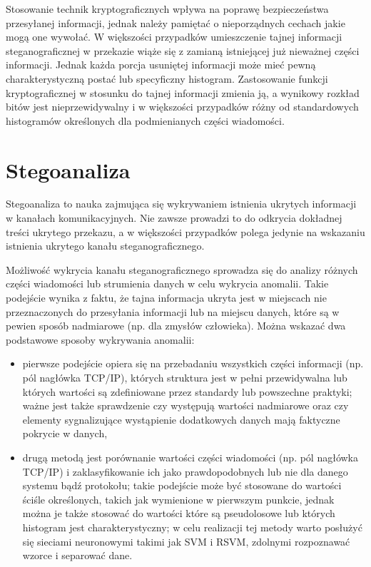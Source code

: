 \documentclass[a4paper,12pt,twoside,openany]{report}
\begin{document}
Stosowanie technik kryptograficznych wpływa na poprawę bezpieczeństwa 
przesyłanej informacji, jednak należy pamiętać o nieporządnych cechach jakie 
mogą one wywołać. W większości przypadków umieszczenie tajnej informacji 
steganograficznej w przekazie wiąże się z zamianą istniejącej już nieważnej 
części informacji. Jednak każda porcja usuniętej informacji może mieć pewną 
charakterystyczną postać lub specyficzny histogram. Zastosowanie funkcji 
kryptograficznej w stosunku do tajnej informacji zmienia ją, a wynikowy rozkład 
bitów jest nieprzewidywalny i w większości przypadków różny od standardowych 
histogramów określonych dla podmienianych części wiadomości.
\section{Stegoanaliza}
Stegoanaliza to nauka zajmująca się wykrywaniem istnienia ukrytych informacji w 
kanałach komunikacyjnych. Nie zawsze prowadzi to do odkrycia dokładnej treści 
ukrytego przekazu, a w większości przypadków polega jedynie na wskazaniu 
istnienia ukrytego kanału steganograficznego.

Możliwość wykrycia kanału steganograficznego sprowadza się do analizy różnych 
części wiadomości lub strumienia danych w celu wykrycia anomalii. Takie 
podejście wynika z faktu, że tajna informacja ukryta jest w miejscach nie 
przeznaczonych do przesyłania informacji lub na miejscu danych, które są w 
pewien sposób nadmiarowe (np. dla zmysłów człowieka). Można wskazać dwa 
podstawowe sposoby wykrywania anomalii:
\begin{itemize}
	\item pierwsze podejście opiera się na przebadaniu wszystkich części 
informacji (np. pól nagłówka TCP/IP), których struktura jest w pełni 
przewidywalna lub których wartości są zdefiniowane przez standardy lub 
powszechne praktyki; ważne jest także sprawdzenie czy występują wartości 
nadmiarowe oraz czy elementy sygnalizujące wystąpienie dodatkowych danych mają 
faktyczne pokrycie w danych,
	\item drugą metodą jest porównanie wartości części wiadomości (np. pól 
nagłówka TCP/IP) i zaklasyfikowanie ich jako prawdopodobnych lub nie dla danego 
systemu bądź protokołu; takie podejście może być stosowane do wartości ściśle 
określonych, takich jak wymienione w pierwszym punkcie, jednak można je także 
stosować do wartości które są pseudolosowe lub których histogram jest 
charakterystyczny; w celu realizacji tej metody warto posłużyć się sieciami 
neuronowymi takimi jak SVM i RSVM, zdolnymi rozpoznawać wzorce i separować dane.
\end{itemize}
\end{document}
